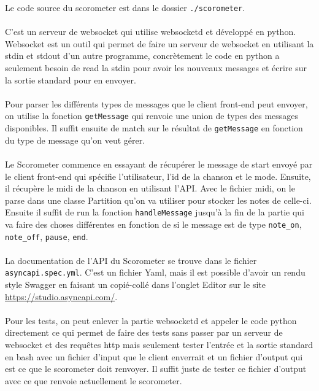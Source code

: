 Le code source du scorometer est dans le dossier \texttt{./scorometer}.
\\\\
C’est un serveur de websocket qui utilise websocketd et développé en python.
Websocket est un outil qui permet de faire un serveur de websocket en utilisant la stdin et stdout d’un autre programme, concrètement le code en python a seulement besoin de read la stdin pour avoir les nouveaux messages et écrire sur la sortie standard pour en envoyer.
\\\\
Pour parser les différents types de messages que le client front-end peut envoyer, on utilise la fonction \texttt{getMessage} qui renvoie une union de types des messages disponibles. Il suffit ensuite de match sur le résultat de \texttt{getMessage} en fonction du type de message qu’on veut gérer.
\\\\
Le Scorometer commence en essayant de récupérer le message de start envoyé par le client front-end qui spécifie l’utilisateur, l’id de la chanson et le mode. Ensuite, il récupère le midi de la chanson en utilisant l’API. Avec le fichier midi, on le parse dans une classe Partition qu’on va utiliser pour stocker les notes de celle-ci. Ensuite il suffit de run la fonction \texttt{handleMessage} jusqu'à la fin de la partie qui va faire des choses différentes en fonction de si le message est de type \verb|note_on|, \verb|note_off|, \verb|pause|, \verb|end|.
\\\\
La documentation de l’API du Scorometer se trouve dans le fichier \verb|asyncapi.spec.yml|. C’est un fichier Yaml, mais il est possible d’avoir un rendu style Swagger en faisant un copié-collé dans l'onglet Editor sur le site \href{https://studio.asyncapi.com/}{https://studio.asyncapi.com/}.
\\\\
Pour les tests, on peut enlever la partie websocketd et appeler le code python directement ce qui permet de faire des tests sans passer par un serveur de websocket et des requêtes http mais seulement tester l'entrée et la sortie standard en bash avec un fichier d’input que le client enverrait et un fichier d’output qui est ce que le scorometer doit renvoyer. Il suffit juste de tester ce fichier d’output avec ce que renvoie actuellement le scorometer.
